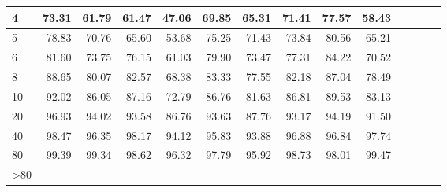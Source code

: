 \begin{tabular}{|l|r|r|r|r|r|r|r|r|r|r|r|r|r|}
4 & 73.31 & 61.79 & 61.47 & 47.06 & 69.85 & 65.31 & 71.41 & 77.57 & 58.43\\\hline
5 & 78.83 & 70.76 & 65.60 & 53.68 & 75.25 & 71.43 & 73.84 & 80.56 & 65.21\\\hline
6 & 81.60 & 73.75 & 76.15 & 61.03 & 79.90 & 73.47 & 77.31 & 84.22 & 70.52\\\hline
8 & 88.65 & 80.07 & 82.57 & 68.38 & 83.33 & 77.55 & 82.18 & 87.04 & 78.49\\\hline
10 & 92.02 & 86.05 & 87.16 & 72.79 & 86.76 & 81.63 & 86.81 & 89.53 & 83.13\\\hline
20 & 96.93 & 94.02 & 93.58 & 86.76 & 93.63 & 87.76 & 93.17 & 94.19 & 91.50\\\hline
40 & 98.47 & 96.35 & 98.17 & 94.12 & 95.83 & 93.88 & 96.88 & 96.84 & 97.74\\\hline
80 & 99.39 & 99.34 & 98.62 & 96.32 & 97.79 & 95.92 & 98.73 & 98.01 & 99.47\\\hline
>80\\\hline
\end{tabular}
